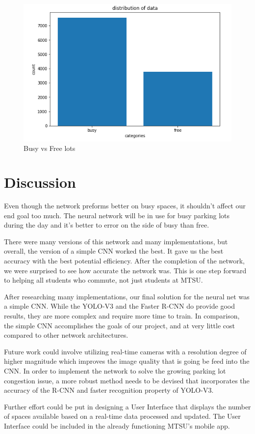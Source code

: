 \documentclass[conference]{IEEEtran}
\begin{document}
\begin{figure}[htbp]
\centerline{\includegraphics[scale=0.7]{./12.PNG}}
\caption{Busy vs Free lots}
\label{fig}
\end{figure}

\section{Discussion}

Even though the network preforms better on busy spaces, it shouldn't affect our end goal too much. The neural network will be in use for busy parking lots during the day and it's better to error on the side of busy than free.

There were many versions of this network and many implementations, but overall, the version of a simple CNN worked the best. It gave us the best accuracy with the best potential efficiency. After the completion of the network, we were surprised to see how accurate the network was. This is one step forward to helping all students who commute, not just students at MTSU.

After researching many implementations, our final solution for the neural net was a simple CNN. While the YOLO-V3 and the Faster R-CNN do provide good results, they are more complex and require more time to train. In comparison, the simple CNN accomplishes the goals of our project, and at very little cost compared to other network architectures.

Future work could involve utilizing real-time cameras with a resolution degree of higher magnitude which improves the image quality that is going be feed into the CNN. In order to implement the network to solve the growing parking lot congestion issue, a more robust method needs to be devised that incorporates the accuracy of the R-CNN and faster recognition property of YOLO-V3.

Further effort could be put in designing a User Interface that displays the number of spaces available based on a real-time data processed and updated. The User Interface could be included in the already functioning MTSU's mobile app.


\end{document}
